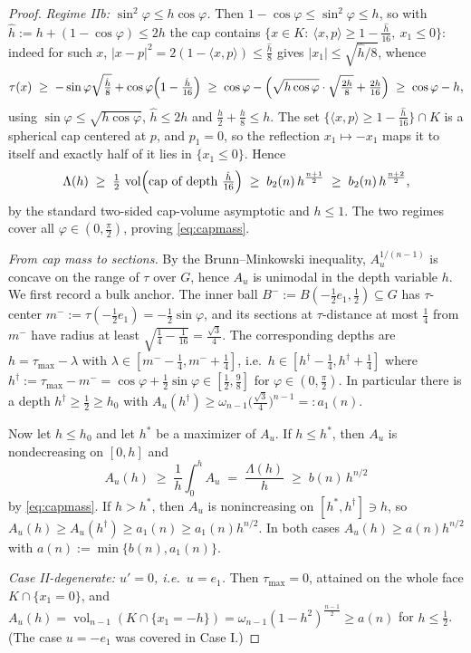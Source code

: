 \documentclass[11pt]{article}
\newcommand{\vol}{\operatorname{vol}}
\begin{document}
\begin{proof}
\emph{Regime IIb: $\sin^2\varphi\le h\cos\varphi$.}  Then
$1-\cos\varphi\le\sin^2\varphi\le h$, so with
$\hat h:=h+(1-\cos\varphi)\le2h$ the cap contains
$\bigl\{x\in K:\ \langle x,p\rangle\ge1-\tfrac{\hat h}{16},\ x_1\le0\bigr\}$:
indeed for such $x$,
$|x-p|^2=2(1-\langle x,p\rangle)\le\tfrac{\hat h}8$ gives
$|x_1|\le\sqrt{\hat h/8}$, whence
\[
\tau(x)\;\ge\;-\sin\varphi\sqrt{\tfrac{\hat h}8}+\cos\varphi
\Bigl(1-\tfrac{\hat h}{16}\Bigr)
\;\ge\;\cos\varphi-\Bigl(\sqrt{h\cos\varphi}\cdot\sqrt{\tfrac{2h}8}
+\tfrac{2h}{16}\Bigr)
\;\ge\;\cos\varphi-h,
\]
using $\sin\varphi\le\sqrt{h\cos\varphi}$, $\hat h\le2h$ and
$\tfrac h2+\tfrac h8\le h$.  The set
$\{\langle x,p\rangle\ge1-\tfrac{\hat h}{16}\}\cap K$ is a spherical cap
centered at $p$, and $p_1=0$, so the reflection $x_1\mapsto-x_1$ maps it to
itself and exactly half of it lies in $\{x_1\le0\}$.  Hence
\[
\Lambda(h)\;\ge\;\tfrac12\,\vol\Bigl(\text{cap of depth }\tfrac{\hat h}{16}\Bigr)
\;\ge\;b_2(n)\,h^{\frac{n+1}2}\;\ge\;b_2(n)\,h^{\frac{n+2}2},
\]
by the standard two-sided cap-volume asymptotic and $h\le1$.  The two regimes
cover all $\varphi\in(0,\tfrac\pi2)$, proving \eqref{eq:capmass}.

\emph{From cap mass to sections.}  By the Brunn--Minkowski inequality,
$A_u^{1/(n-1)}$ is concave on the range of $\tau$ over $G$, hence
$A_u$ is unimodal in the depth variable $h$.  We first record a bulk anchor.
The inner ball $B^-:=B(-\tfrac12e_1,\tfrac12)\subseteq G$ has $\tau$-center
$m^-:=\tau(-\tfrac12e_1)=-\tfrac12\sin\varphi$, and its sections at
$\tau$-distance at most $\tfrac14$ from $m^-$ have radius at least
$\sqrt{\tfrac14-\tfrac1{16}}=\tfrac{\sqrt3}4$.  The corresponding depths are
$h=\tau_{\max}-\lambda$ with $\lambda\in[m^--\tfrac14,m^-+\tfrac14]$, i.e.\
$h\in[h^\dagger-\tfrac14,h^\dagger+\tfrac14]$ where
$h^\dagger:=\tau_{\max}-m^-=\cos\varphi+\tfrac12\sin\varphi
\in[\tfrac12,\tfrac98]$ for $\varphi\in(0,\tfrac\pi2)$.  In particular there
is a depth $h^\dagger\ge\tfrac12\ge h_0$ with
$A_u(h^\dagger)\ge\omega_{n-1}\bigl(\tfrac{\sqrt3}4\bigr)^{n-1}=:a_1(n)$.

Now let $h\le h_0$ and let $h^*$ be a maximizer of $A_u$.  If $h\le h^*$,
then $A_u$ is nondecreasing on $[0,h]$ and
\[
A_u(h)\;\ge\;\frac1h\int_0^hA_u\;=\;\frac{\Lambda(h)}h
\;\ge\;b(n)\,h^{n/2}
\]
by \eqref{eq:capmass}.  If $h>h^*$, then $A_u$ is nonincreasing on
$[h^*,h^\dagger]\ni h$, so
$A_u(h)\ge A_u(h^\dagger)\ge a_1(n)\ge a_1(n)h^{n/2}$.  In both cases
$A_u(h)\ge a(n)h^{n/2}$ with $a(n):=\min\{b(n),a_1(n)\}$.

\emph{Case II-degenerate: $u'=0$, i.e.\ $u=e_1$.}  Then
$\tau_{\max}=0$, attained on the whole face $K\cap\{x_1=0\}$, and
$A_u(h)=\vol_{n-1}(K\cap\{x_1=-h\})=\omega_{n-1}(1-h^2)^{\frac{n-1}2}
\ge a(n)$ for $h\le\tfrac12$.  (The case $u=-e_1$ was covered in Case I.)
\end{proof}
\end{document}
